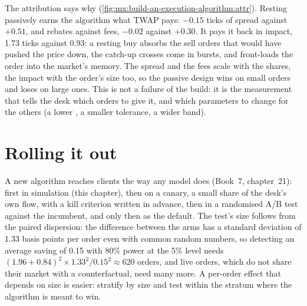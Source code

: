\begin{omfigure}

\label{fig:mx:build-an-execution-algorithm:attr}
\end{omfigure}

The attribution says why (\cref{fig:mx:build-an-execution-algorithm:attr}). Resting passively earns the algorithm what TWAP pays: $-0.15$ ticks of
spread against $+0.51$, and rebates against fees, $-0.02$ against $+0.30$. It pays it back in impact, 1.73 ticks against 0.93: a resting buy absorbs the
sell orders that would have pushed the price down, the catch-up crosses come in bursts, and  front-loads the order into the market's memory.
The spread and the fees scale with the shares, the impact with the order's size too, so the passive design wins on small orders and loses on large
ones. This is not a failure of the build: it is the measurement that tells the desk which orders to give it, and which parameters to change for the
others (a lower , a smaller tolerance, a wider band).

\section{Rolling it out}

A new algorithm reaches clients the way any model does (Book~7, chapter~21): first in simulation (this chapter), then on a canary, a small share of
the desk's own flow, with a kill criterion written in advance, then in a randomised A/B test against the incumbent, and only then as the default. The
test's size follows from the paired dispersion: the difference between the arms has a standard deviation of 1.33 basis points per order even with
common random numbers, so detecting an average saving of 0.15 with 80\% power at the 5\% level needs $(1.96 + 0.84)^2 \times 1.33^2 / 0.15^2
\approx 620$ orders, and live orders, which do not share their market with a counterfactual, need many more. A per-order effect that depends on size
is easier: stratify by size and test within the stratum where the algorithm is meant to win.

